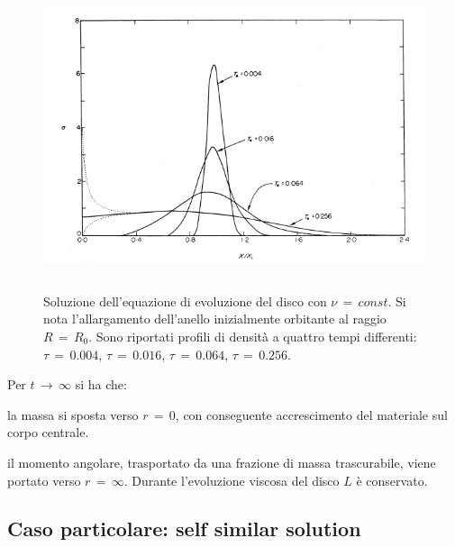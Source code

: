 \begin{figure}[H]
    \centering
    \includegraphics[height=9cm, width=12cm]{Immagini/IntroTeorica/EvoluzioneAnello.png}
    \caption{Soluzione dell'equazione di evoluzione del disco con $\nu\,=\,const$. Si nota l'allargamento dell'anello inizialmente orbitante al raggio $R\,=\,R_0$. Sono riportati profili di densità a quattro tempi differenti:$\tau\,=\,0.004$, $\tau\,=\,0.016$, $\tau\,=\,0.064$, $\tau\,=\,0.256$. \parencite{BellPringle1974}}
    \label{fig:ev_sp_disc}
\end{figure}

Per $t\,\rightarrow\,\infty$ si ha che:
\begin{list}{\textbf{-}}{\setlength{\itemsep}{0cm}}
    \item la massa si sposta verso $r\,=\,0$, con conseguente accrescimento del materiale sul corpo centrale.
    \item il momento angolare, trasportato da una frazione di massa trascurabile, viene portato verso $r\,=\,\infty$. Durante l'evoluzione viscosa del disco $L$ è conservato.
\end{list}

\subsection{Caso particolare: self similar solution}

